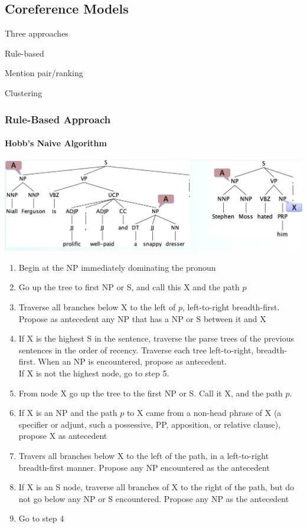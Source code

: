 \documentclass[10pt]{report}
\begin{document}
\subsection{Coreference Models}
Three approaches
\begin{list}{}{}
	\item Rule-based
	\item Mention pair/ranking
	\item Clustering
\end{list}
\subsubsection{Rule-Based Approach}
\paragraph{Hobb's Naive Algorithm}
\begin{center}
	\includegraphics[scale=0.5]{103.png}
\end{center}
\begin{enumerate}
	\item Begin at the NP immediately dominating the pronoun
	\item Go up the tree to first NP or S, and call this X and the path $p$
	\item Traverse all branches below X to the left of $p$, left-to-right breadth-first.\\
	Propose as antecedent any NP that has a NP or S between it and X
	\item If X is the highest S in the sentence, traverse the parse trees of the previous sentences in the order of recency. Traverse each tree left-to-right, breadth-first. When an NP is encountered, propose as antecedent.\\
	If X is not the highest node, go to step 5.
	\item From node X go up the tree to the first NP or S. Call it X, and the path $p$.
	\item If X is an NP and the path $p$ to X came from a non-head phrase of X (a specifier or adjunt, such a possessive, PP, apposition, or relative clause), propose X as antecedent
	\item Travers all branches below X to the left of the path, in a left-to-right breadth-first manner. Propose any NP encountered as the antecedent
	\item If X is an S node, traverse all branches of X to the right of the path, but do not go below any NP or S encountered. Propose any NP as the antecedent
	\item Go to step 4
\end{enumerate}
\end{document}

